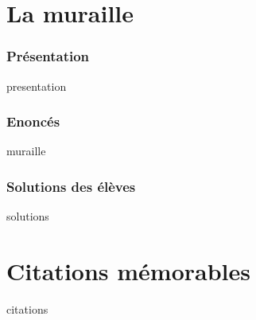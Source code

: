 \documentclass[12pt,A4]{book}
\theoremstyle{definition}
\theoremstyle{thm}
\theoremstyle{def}
\newcounter{sol}[subsection]
\begin{document}

\chapter{La muraille}
\minitoc \bigskip



\subsection{Présentation}

{presentation}

\subsection{Enoncés}

{muraille}

\subsection{Solutions des élèves}

{solutions}




\chapter{Citations mémorables}

{citations}
\end{document}
